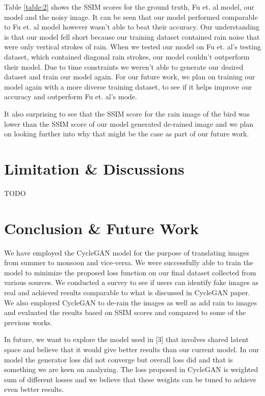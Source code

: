 \documentclass{article}
\begin{document}
Table \ref{table:2} shows the SSIM scores for the ground truth, Fu et. al model, our model and the noisy image. It can be seen that our model performed comparable to Fu et. al model however wasn't able to beat their accuracy. Our understanding is that our model fell short because our training dataset contained rain noise that were only vertical strokes of rain. When we tested our model on Fu et. al's testing dataset, which contained diagonal rain strokes, our model couldn't outperform their model. Due to time constraints we weren't able to generate our desired dataset and train our model again. For our future work, we plan on training our model again with a more diverse training dataset, to see if it helps improve our accuracy and outperform Fu et. al's mode. 

It also surprising to see that the SSIM score for the rain image of the bird was lower than the SSIM score of our model generated de-rained image and we plan on looking further into why that might be the case as part of our future work. 

\section{Limitation \& Discussions}

TODO

\section{Conclusion \& Future Work}

We have employed the CycleGAN model for the purpose of translating images from summer to monsoon and vice-versa. We were successfully able to train the model to minimize the proposed loss function on our final dataset collected from various sources. We conducted a survey to see if users can identify fake images as real and achieved results comparable to what is discussed in CycleGAN paper. We also employed CycleGAN to de-rain the images as well as add rain to images and evaluated the results based on SSIM scores and compared to some of the previous works.

In future, we want to explore the model used in [3] that involves shared latent space and believe that it would give better results than our current model. In our model the generator loss did not converge but overall loss did and that is something we are keen on analyzing. The loss proposed in CycleGAN is weighted sum of different losses and we believe that these weights can be tuned to achieve even better results.
\end{document}
